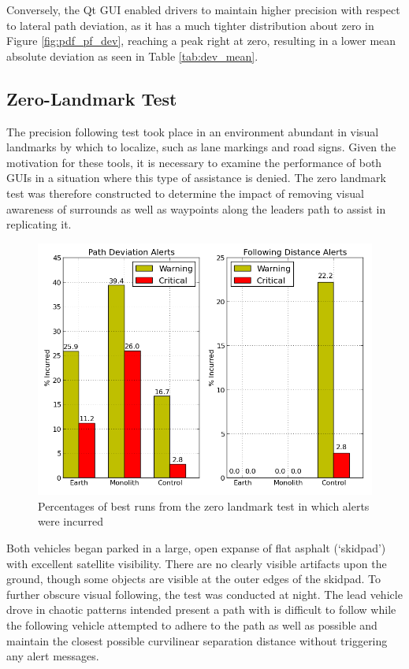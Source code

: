 \documentclass[twocolumn,10pt]{article}
\begin{document}
    Conversely, the Qt GUI enabled drivers to maintain higher precision with respect to lateral path deviation, as it has a much tighter distribution about zero in Figure \ref{fig:pdf_pf_dev}, reaching a peak right at zero, resulting in a lower mean absolute deviation as seen in Table \ref{tab:dev_mean}.



  \subsection*{Zero-Landmark Test}

    The precision following test took place in an environment abundant in visual landmarks by which to localize, such as lane markings and road signs.  Given the motivation for these tools, it is necessary to examine the performance of both GUIs in a situation where this type of assistance is denied.  The zero landmark test was therefore constructed to determine the impact of removing visual awareness of surrounds as well as waypoints along the leaders path to assist in replicating it.
    
    \begin{figure}[ht] \centering
      \includegraphics[width=\columnwidth]{../graphics/zero_landmark_alert_percents.png}
      \caption{Percentages of best runs from the zero landmark test in which alerts were incurred}
      \label{fig:zero_landmark_alert_percents}
    \end{figure}

    Both vehicles began parked in a large, open expanse of flat asphalt (`skidpad') with excellent satellite visibility.  There are no clearly visible artifacts upon the ground, though some objects are visible at the outer edges of the skidpad.  To further obscure visual following, the test was conducted at night.  The lead vehicle drove in chaotic patterns intended present a path with is difficult to follow while the following vehicle attempted to adhere to the path as well as possible and maintain the closest possible curvilinear separation distance without triggering any alert messages.
\end{document}

